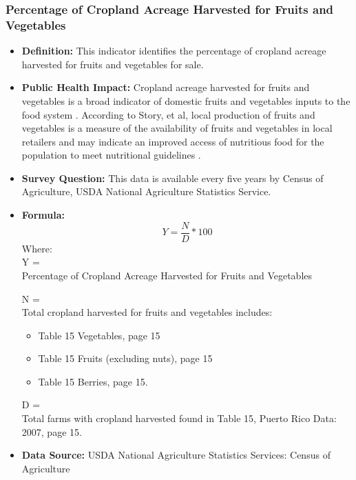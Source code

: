 \documentclass[12pt,letterpaper]{report}
\begin{document}
\subsubsection{Percentage of Cropland Acreage Harvested for Fruits and Vegetables} 
	\begin{itemize}
		\item \textbf{Definition:} This indicator identifies the percentage of cropland acreage harvested for fruits and vegetables for sale.

		\item \textbf{Public Health Impact:} Cropland acreage harvested for fruits and vegetables is a broad indicator of domestic fruits and vegetables inputs to the food system \cite{sobal1998conceptual}. According to Story, et al, local production of fruits and vegetables is a measure of the availability of fruits and vegetables in local retailers and may indicate an improved access of nutritious food for the population to meet nutritional guidelines \cite{story2008creating}.
		\item \textbf{Survey Question:}
		This data is available every five years by Census of Agriculture, USDA National Agriculture Statistics Service.
		\item \textbf{Formula:} 
			\begin{equation}
				Y = \frac{N}{D} *100
			\end{equation}
Where: \\
			Y = \\ Percentage of Cropland Acreage Harvested for Fruits and Vegetables
			
			N = \\ Total cropland harvested for fruits and vegetables includes:
\begin{itemize}
  \item Table 15 Vegetables, page 15
  \item Table 15 Fruits (excluding nuts), page 15
  \item Table 15 Berries, page 15.
\end{itemize}
			D = \\ Total farms with cropland harvested found in Table 15, Puerto Rico Data: 2007, page 15. 
			
		\item \textbf{Data Source:} USDA National Agriculture Statistics Services: Census of Agriculture
	\end{itemize}
\end{document}
